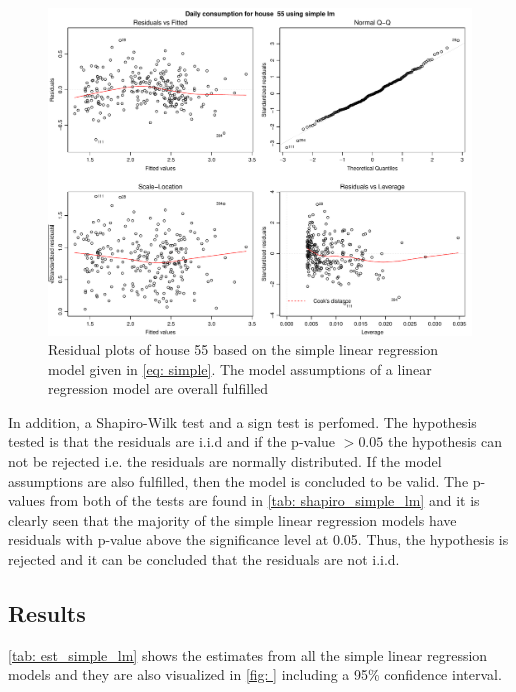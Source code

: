 \begin{figure}
    \centering
    \includegraphics[width=1.\textwidth]{../../../figures/simple_lm55.pdf}
    \caption{Residual plots of house 55 based on the simple linear regression model given in \cref{eq: simple}. The model assumptions of a linear regression model are overall fulfilled}
    \label{fig: simple_lm_55}
\end{figure}
In addition, a Shapiro-Wilk test and a sign test is perfomed. The hypothesis tested is that the residuals are i.i.d and if the p-value $> 0.05$ the hypothesis can not be rejected i.e. the residuals are normally distributed. If the model assumptions are also fulfilled, then the model is concluded to be valid. The p-values from both of the tests are found in \cref{tab: shapiro_simple_lm} and it is clearly seen that the majority of the simple linear regression models have residuals with p-value above the significance level at 0.05. Thus, the hypothesis is rejected and it can be concluded that the residuals are not i.i.d.

\subsection{Results}
\cref{tab: est_simple_lm} shows the estimates from all the simple linear regression models and they are also visualized in \cref{fig: } including a 95\% confidence interval. 

